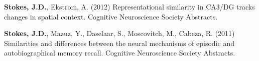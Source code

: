 \documentclass[line,margin,10pt]{res}
\begin{document}
\begin{resume}

\textbf{Stokes, J.D.}, Ekstrom, A. (2012) Representational similarity in CA3/DG tracks changes in spatial context. Cognitive Neuroscience Society Abstracts.
 	
% 	
\textbf{Stokes, J.D.}, Mazuz, Y., Daselaar, S., Moscovitch, M., Cabeza, R. (2011) Similarities and differences between the neural mechanisms of episodic and autobiographical memory recall. Cognitive Neuroscience Society Abstracts.
 	
% 	
% 	

\end{resume}
\end{document}
